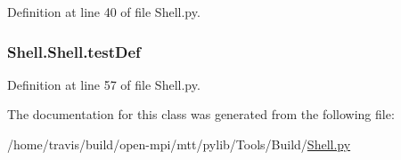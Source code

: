 Definition at line 40 of file Shell.\-py.

\hypertarget{class_shell_1_1_shell_ac2533422279cd3b3d3bc43e8b3de1301}{
\subsubsection[{test\-Def}]{\setlength{\rightskip}{0pt plus 5cm}Shell.\-Shell.\-test\-Def}}\label{class_shell_1_1_shell_ac2533422279cd3b3d3bc43e8b3de1301}


Definition at line 57 of file Shell.\-py.



The documentation for this class was generated from the following file\-:\begin{DoxyCompactItemize}
\item 
/home/travis/build/open-\/mpi/mtt/pylib/\-Tools/\-Build/\hyperlink{_shell_8py}{Shell.\-py}\end{DoxyCompactItemize}
